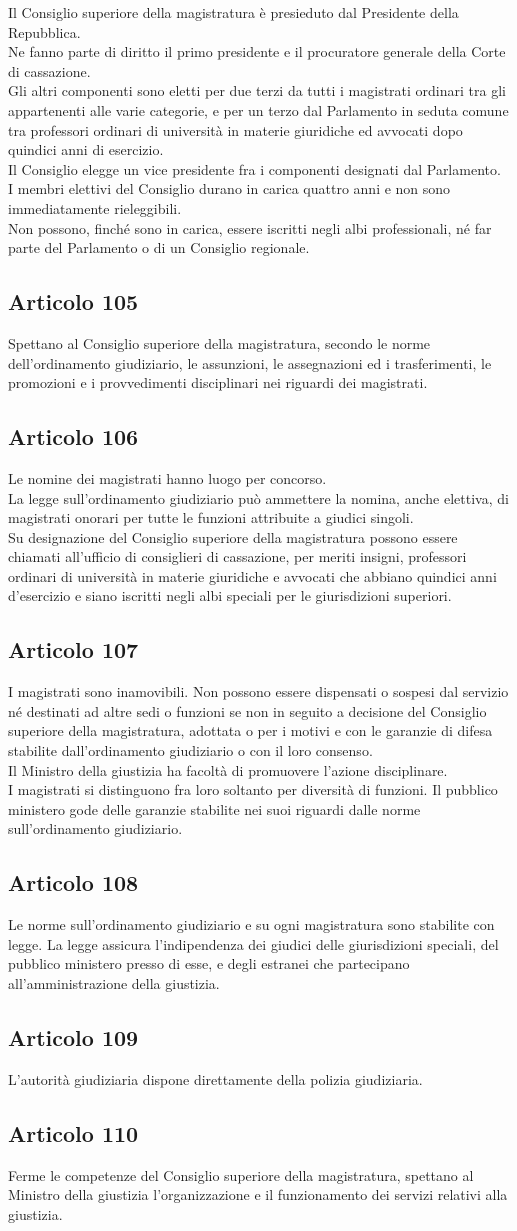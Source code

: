 \documentclass{article}
\newcommand{\articolo}[1]{
	\subsection*{Articolo #1}
}
\begin{document}
Il Consiglio superiore della magistratura è presieduto dal Presidente della Repubblica.\\
Ne fanno parte di diritto il primo presidente e il procuratore generale della Corte di cassazione.\\
Gli altri componenti sono eletti per due terzi da tutti i magistrati ordinari tra gli appartenenti alle varie categorie, e per un terzo dal Parlamento in seduta comune tra professori ordinari di università in materie giuridiche ed avvocati dopo quindici anni di esercizio.\\
Il Consiglio elegge un vice presidente fra i componenti designati dal Parlamento.\\
I membri elettivi del Consiglio durano in carica quattro anni e non sono immediatamente rieleggibili.\\
Non possono, finché sono in carica, essere iscritti negli albi professionali, né far parte del Parlamento o di un Consiglio regionale.
\articolo{105}
Spettano al Consiglio superiore della magistratura, secondo le norme dell’ordinamento giudiziario, le assunzioni, le assegnazioni ed i trasferimenti, le promozioni e i provvedimenti disciplinari nei riguardi dei magistrati.
\articolo{106}
Le nomine dei magistrati hanno luogo per concorso.\\
La legge sull’ordinamento giudiziario può ammettere la nomina, anche elettiva, di magistrati onorari per tutte le funzioni attribuite a giudici singoli.\\
Su designazione del Consiglio superiore della magistratura possono essere chiamati all’ufficio di consiglieri di cassazione, per meriti insigni, professori ordinari di università in materie giuridiche e avvocati che abbiano quindici anni d’esercizio e siano iscritti negli albi speciali per le giurisdizioni superiori.
\articolo{107}
I magistrati sono inamovibili. Non possono essere dispensati o sospesi dal servizio né destinati ad altre sedi o funzioni se non in seguito a decisione del Consiglio superiore della magistratura, adottata o per i motivi e con le garanzie di difesa stabilite dall’ordinamento giudiziario o con il loro consenso.\\
Il Ministro della giustizia ha facoltà di promuovere l’azione disciplinare.\\
I magistrati si distinguono fra loro soltanto per diversità di funzioni.
Il pubblico ministero gode delle garanzie stabilite nei suoi riguardi dalle norme sull’ordinamento giudiziario.
\articolo{108}
Le norme sull’ordinamento giudiziario e su ogni magistratura sono stabilite con legge.
La legge assicura l’indipendenza dei giudici delle giurisdizioni speciali, del pubblico ministero presso di esse, e degli estranei che partecipano all’amministrazione della giustizia.
\articolo{109}
L’autorità giudiziaria dispone direttamente della polizia giudiziaria.
\articolo{110}
Ferme le competenze del Consiglio superiore della magistratura, spettano al Ministro della giustizia l’organizzazione e il funzionamento dei servizi relativi alla giustizia.
\end{document}

